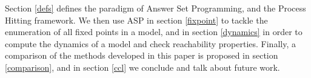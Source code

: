 
Section \ref{defs} defines the paradigm of Answer Set Programming,
and the Process Hitting framework.
We then use ASP in section \ref{fixpoint} to tackle the enumeration
of all fixed points in a model,
and in section \ref{dynamics} in order to compute the dynamics of a model
and check reachability properties.
Finally, a comparison of the methods developed in this paper is
proposed in section \ref{comparison},
and in section \ref{ccl} we conclude and talk about future work.

